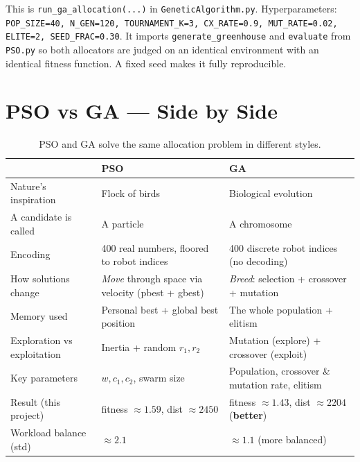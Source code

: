 \documentclass[11pt]{article}
\begin{document}
\begin{codebox}
This is \texttt{run\_ga\_allocation(...)} in \texttt{GeneticAlgorithm.py}.
Hyperparameters: \texttt{POP\_SIZE=40, N\_GEN=120, TOURNAMENT\_K=3, CX\_RATE=0.9,
MUT\_RATE=0.02, ELITE=2, SEED\_FRAC=0.30}. It imports
\texttt{generate\_greenhouse} and \texttt{evaluate} from \texttt{PSO.py} so both
allocators are judged on an identical environment with an identical fitness
function. A fixed seed makes it fully reproducible.
\end{codebox}

\section{PSO vs GA --- Side by Side}

\begin{table}[h]
\centering
\renewcommand{\arraystretch}{1.3}
\begin{tabular}{@{}p{3.4cm} p{5.1cm} p{5.1cm}@{}}
\toprule
& \textbf{PSO} & \textbf{GA} \\
\midrule
Nature's inspiration & Flock of birds & Biological evolution \\
A candidate is called & A particle & A chromosome \\
Encoding & 400 real numbers, floored to robot indices & 400 discrete robot indices (no decoding) \\
How solutions change & \emph{Move} through space via velocity (pbest + gbest) & \emph{Breed}: selection + crossover + mutation \\
Memory used & Personal best + global best position & The whole population + elitism \\
Exploration vs exploitation & Inertia + random $r_1,r_2$ & Mutation (explore) + crossover (exploit) \\
Key parameters & $w, c_1, c_2$, swarm size & Population, crossover \& mutation rate, elitism \\
Result (this project) & fitness $\approx 1.59$, dist $\approx 2450$ & fitness $\approx 1.43$, dist $\approx 2204$ (\textbf{better}) \\
Workload balance (std) & $\approx 2.1$ & $\approx 1.1$ (more balanced) \\
\bottomrule
\end{tabular}
\caption{PSO and GA solve the same allocation problem in different styles.}
\end{table}
\end{document}
